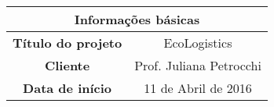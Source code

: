   \begin{table}[ht]
    \centering
    \begin{tabular}{| c | c |}
      \hline
      \multicolumn{2}{|c|}{Informações básicas} \\
      \hline
      \textbf{Título do projeto} & EcoLogistics \\
      \hline
      \textbf{Cliente} & Prof. Juliana Petrocchi \\
      \hline
      \textbf{Data de início} & 11 de Abril de 2016 \\
      \hline
    \end{tabular}
  \end{table}

  
  
  
  
  
  
  
  
  
  
  
